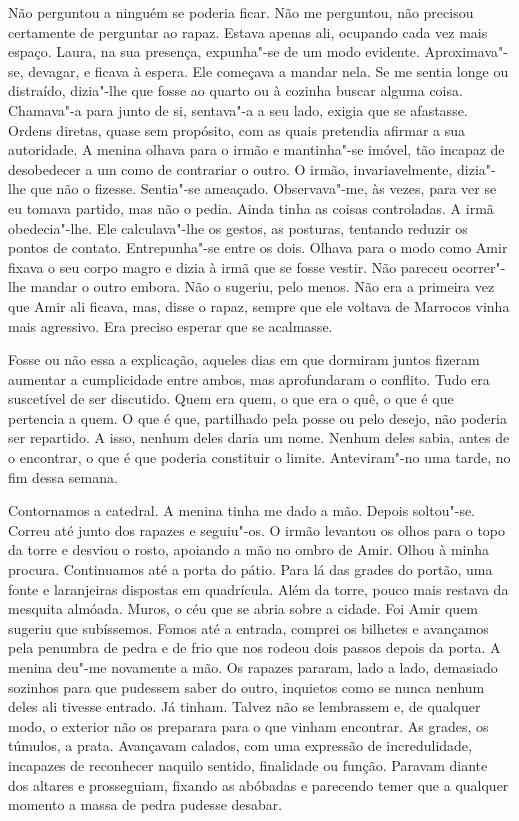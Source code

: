 Não perguntou a ninguém se poderia ficar. Não me perguntou, não precisou
certamente de perguntar ao rapaz. Estava apenas ali, ocupando cada vez
mais espaço. Laura, na sua presença, expunha"-se de um modo evidente.
Aproximava"-se, devagar, e ficava à espera. Ele começava a mandar nela.
Se me sentia longe ou distraído, dizia"-lhe que fosse ao quarto ou à
cozinha buscar alguma coisa. Chamava"-a para junto de si, sentava"-a a
seu lado, exigia que se afastasse. Ordens diretas, quase sem propósito,
com as quais pretendia afirmar a sua autoridade. A menina olhava para o
irmão e mantinha"-se imóvel, tão incapaz de desobedecer a um como de
contrariar o outro. O irmão, invariavelmente, dizia"-lhe que não o
fizesse. Sentia"-se ameaçado. Observava"-me, às vezes, para ver se eu
tomava partido, mas não o pedia. Ainda tinha as coisas controladas. A
irmã obedecia"-lhe. Ele calculava"-lhe os gestos, as posturas, tentando
reduzir os pontos de contato. Entrepunha"-se entre os dois. Olhava para
o modo como Amir fixava o seu corpo magro e dizia à irmã que se fosse
vestir. Não pareceu ocorrer"-lhe mandar o outro embora. Não o sugeriu,
pelo menos. Não era a primeira vez que Amir ali ficava, mas, disse o
rapaz, sempre que ele voltava de Marrocos vinha mais agressivo. Era
preciso esperar que se acalmasse.

Fosse ou não essa a explicação, aqueles dias em que dormiram juntos
fizeram aumentar a cumplicidade entre ambos, mas aprofundaram o
conflito. Tudo era suscetível de ser discutido. Quem era quem, o que
era o quê, o que é que pertencia a quem. O que é que, partilhado pela
posse ou pelo desejo, não poderia ser repartido. A isso, nenhum deles
daria um nome. Nenhum deles sabia, antes de o encontrar, o que é que
poderia constituir o limite. Anteviram"-no uma tarde, no fim dessa
semana.

Contornamos a catedral. A menina tinha me dado a mão. Depois
soltou"-se. Correu até junto dos rapazes e seguiu"-os. O irmão levantou
os olhos para o topo da torre e desviou o rosto, apoiando a mão no ombro
de Amir. Olhou à minha procura. Continuamos até a porta do pátio. Para
lá das grades do portão, uma fonte e laranjeiras dispostas em
quadrícula. Além da torre, pouco mais restava da mesquita almóada.
Muros, o céu que se abria sobre a cidade. Foi Amir quem sugeriu que
subíssemos. Fomos até a entrada, comprei os bilhetes e avançamos pela
penumbra de pedra e de frio que nos rodeou dois passos depois da porta.
A menina deu"-me novamente a mão. Os rapazes pararam, lado a lado,
demasiado sozinhos para que pudessem saber do outro, inquietos como se
nunca nenhum deles ali tivesse entrado. Já tinham. Talvez não se
lembrassem e, de qualquer modo, o exterior não os preparara para o que
vinham encontrar. As grades, os túmulos, a prata. Avançavam calados, com
uma expressão de incredulidade, incapazes de reconhecer naquilo sentido,
finalidade ou função. Paravam diante dos altares e prosseguiam, fixando
as abóbadas e parecendo temer que a qualquer momento a massa de pedra
pudesse desabar.

